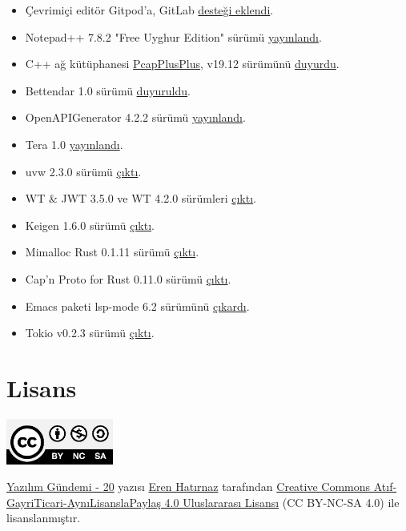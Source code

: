 \documentclass[11pt]{article}
\begin{document}
\begin{itemize}
\item Çevrimiçi editör Gitpod'a, GitLab \href{https://www.gitpod.io/blog/gitlab-support/}{desteği eklendi}.
\item Notepad++ 7.8.2 "Free Uyghur Edition" sürümü \href{https://notepad-plus-plus.org/news/v782-free-uyghur-edition/}{yayınlandı}.
\item C++ ağ kütüphanesi \href{https://github.com/seladb/PcapPlusPlus}{PcapPlusPlus}, v19.12 sürümünü \href{https://github.com/seladb/PcapPlusPlus/releases/tag/v19.12}{duyurdu}.
\item Bettendar 1.0 sürümü \href{https://bottender.js.org/blog/2019/12/05/bottender-1}{duyuruldu}.
\item OpenAPIGenerator 4.2.2 sürümü \href{https://github.com/OpenAPITools/openapi-generator/releases/tag/v4.2.2}{yayınlandı}.
\item Tera 1.0 \href{https://www.vincentprouillet.com/blog/tera-v1-is-here/}{yayınlandı}.
\item uvw 2.3.0 sürümü \href{https://github.com/skypjack/uvw/releases/tag/v2.3.0\_libuv-v1.34}{çıktı}.
\item WT \& JWT 3.5.0 ve WT 4.2.0 sürümleri \href{https://www.webtoolkit.eu/wt/news/2019/12/03/wt\_\_\_jwt\_3\_5\_0\_and\_wt\_4\_2\_0}{çıktı}.
\item Keigen 1.6.0 sürümü \href{https://github.com/paramsen/Keigen/releases/tag/1.6.0}{çıktı}.
\item Mimalloc Rust 0.1.11 sürümü \href{https://github.com/purpleprotocol/mimalloc\_rust/releases/tag/v0.1.11}{çıktı}.
\item Cap'n Proto for Rust 0.11.0 sürümü \href{https://dwrensha.github.io/capnproto-rust/2019/12/06/async-await.html}{çıktı}.
\item Emacs paketi lsp-mode 6.2 sürümünü \href{https://github.com/emacs-lsp/lsp-mode/blob/master/doc/changelog.org\#release-62}{çıkardı}.
\item Tokio v0.2.3 sürümü \href{https://github.com/tokio-rs/tokio/releases/tag/tokio-0.2.3}{çıktı}.
\end{itemize}
\section{Lisans}
\label{sec:orgea53ec3}
\begin{center}
\begin{center}
\includegraphics[height=1.5cm]{../../../img/CC_BY-NC-SA_4.0.png}
\end{center}

\href{yazilim-gundemi-20.pdf}{Yazılım Gündemi - 20} yazısı \href{https://erenhatirnaz.github.io}{Eren Hatırnaz} tarafından \href{http://creativecommons.org/licenses/by-nc-sa/4.0/}{Creative Commons
Atıf-GayriTicari-AynıLisanslaPaylaş 4.0 Uluslararası Lisansı} (CC BY-NC-SA 4.0)
ile lisanslanmıştır.
\end{center}
\end{document}
